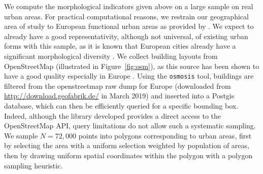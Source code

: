 \documentclass[letterpaper]{article}
\begin{document}
We compute the morphological indicators given above on a large sample on real urban areas. For practical computational reasons, we restrain our geographical area of study to European functional urban areas as provided by \cite{bretagnolle2019following}. We expect to already have a good representativity, although not universal, of existing urban forms with this sample, as it is known that European cities already have a significant morphological diversity \citep{le2015forme}. We collect building layouts from OpenStreetMap (illustrated in Figure~\ref{fig:osm}), as this source has been shown to have a good quality especially in Europe \citep{mooney2010towards}. Using the \texttt{osmosis} tool, buildings are filtered from the openstreetmap raw dump for Europe (downloaded from \url{http://download.geofabrik.de/} in March 2019) and inserted into a Postgis database, which can then be efficiently queried for a specific bounding box. Indeed, although the library developed provides a direct access to the OpenStreetMap API, query limitations do not allow such a systematic sampling.
We sample $N=72,000$ points into polygons corresponding to urban areas, first by selecting the area with a uniform selection weighted by population of areas, then by drawing uniform spatial coordinates within the polygon with a polygon sampling heuristic. %

\end{document}
